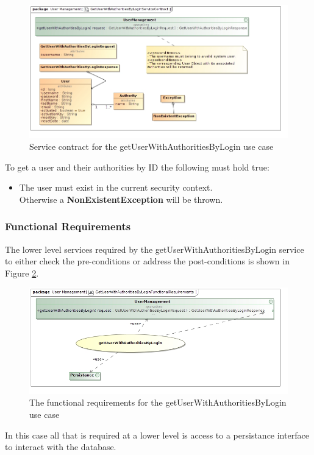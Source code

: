 \begin{figure}[H]
	\begin{center}
		\includegraphics[scale=0.55]{../Diagrams and Charts/Users/GetUserWithAuthoritiesByLoginServiceContract.jpg}
		\caption{Service contract for the getUserWithAuthoritiesByLogin use case}
		\label{fig:GetUserWithAuthoritiesByLoginServicesContract}
	\end{center}
\end{figure}

To get a user and their authorities by ID the following must hold true:
\begin{itemize}
	\item The user must exist in the current security context.\\
	Otherwise a \textbf{NonExistentException} will be thrown.
\end{itemize}

\subsubsection{Functional Requirements}
The lower level services required by the getUserWithAuthoritiesByLogin service
to either check the pre-conditions or address the post-conditions is shown
in Figure \ref{getUserWithAuthoritiesByLoginFR}.

\begin{figure}[H]
	\begin{center}
		\includegraphics[scale=0.5]{../Diagrams and Charts/Users/GetUserWithAuthoritiesByLoginFunctionalRequirements.jpg}
		\caption{The functional requirements for the getUserWithAuthoritiesByLogin use case}
		\label{getUserWithAuthoritiesByLoginFR}
	\end{center}	
\end{figure}

In this case all that is required at a lower level is access to a persistance
interface to interact with the database.